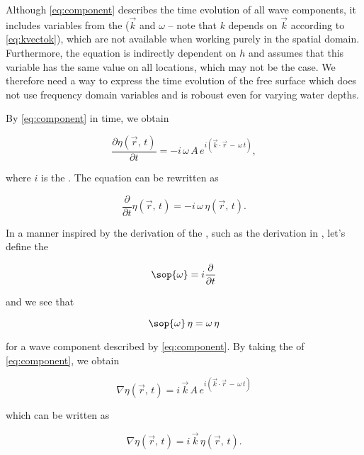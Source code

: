 Although \eqref{eq:component} describes the time evolution of all wave components, it includes variables from the  ($\vec{k}$ and $\omega$ -- note that $k$ depends on $\vec{k}$ according to \eqref{eq:kvectok}), which are not available when working purely in the spatial domain. Furthermore, the equation is indirectly dependent on $h$ and assumes that this variable has the same value on all locations, which may not be the case. We therefore need a way to express the time evolution of the free surface which does not use frequency domain variables and is roboust even for varying water depths.

By  \eqref{eq:component} in time, we obtain

\begin{equation}
\frac{\partial\eta(\vec{r},\,t)}{\partial t} = -i\,\omega\,A\,e^{i(\vec{k}\cdot\vec{r}\,-\,\omega\,t)},
\end{equation}

where $i$ is the . The equation can be rewritten as

\begin{equation}
\frac{\partial}{\partial t}\eta(\vec{r},\,t) = -i\,\omega\,\eta(\vec{r},\,t).
\end{equation}

In a manner inspired by the derivation of the , such as the derivation in \citep{Bransden2000}, let's define the 

\begin{equation} \label{eq:opomega}
\sop{\omega} = i\frac{\partial}{\partial t}
\end{equation}

and we see that

\begin{equation} \label{eq:opomegaaction}
\sop{\omega}\,\eta = \omega\,\eta
\end{equation}

for a wave component described by \eqref{eq:component}. By taking the  of \eqref{eq:component}, we obtain

\begin{equation}
\nabla\eta(\vec{r},\,t) = i\,\vec{k}\,A\,e^{i(\vec{k}\cdot\vec{r}\,-\,\omega\,t)}
\end{equation}

which can be written as

\begin{equation}
\nabla\eta(\vec{r},\,t) = i\,\vec{k}\,\eta(\vec{r},\,t).
\end{equation}

